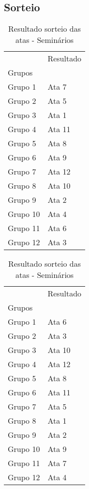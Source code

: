 \documentclass[11pt]{article}
\begin{document}
\subsection{Sorteio}
\label{sec:orgd68eba8}
\begin{table}
\centering
\caption{Resultado sorteio das atas - Seminários}
\begin{tabular}{ll}
\toprule
{} & Resultado \\
Grupos   &           \\
\midrule
Grupo 1  &     Ata 7 \\
Grupo 2  &     Ata 5 \\
Grupo 3  &     Ata 1 \\
Grupo 4  &    Ata 11 \\
Grupo 5  &     Ata 8 \\
Grupo 6  &     Ata 9 \\
Grupo 7  &    Ata 12 \\
Grupo 8  &    Ata 10 \\
Grupo 9  &     Ata 2 \\
Grupo 10 &     Ata 4 \\
Grupo 11 &     Ata 6 \\
Grupo 12 &     Ata 3 \\
\bottomrule
\end{tabular}
\end{table}
\begin{table}
\centering
\caption{Resultado sorteio das atas - Seminários}
\begin{tabular}{ll}
\toprule
{} & Resultado \\
Grupos   &           \\
\midrule
Grupo 1  &     Ata 6 \\
Grupo 2  &     Ata 3 \\
Grupo 3  &    Ata 10 \\
Grupo 4  &    Ata 12 \\
Grupo 5  &     Ata 8 \\
Grupo 6  &    Ata 11 \\
Grupo 7  &     Ata 5 \\
Grupo 8  &     Ata 1 \\
Grupo 9  &     Ata 2 \\
Grupo 10 &     Ata 9 \\
Grupo 11 &     Ata 7 \\
Grupo 12 &     Ata 4 \\
\bottomrule
\end{tabular}
\end{table}
\end{document}
